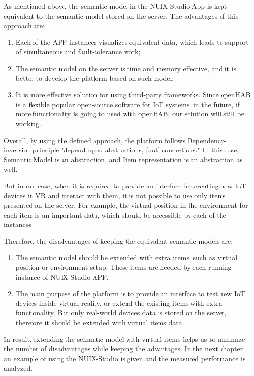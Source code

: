 As mentioned above, the semantic model in the NUIX-Studio App is kept equivalent to the semantic model stored on the server. The advantages of this approach are:

\begin{enumerate}
    \item Each of the APP instances visualizes equivalent data, which leads to support of simultaneous and fault-tolerance work;
    \item The semantic model on the server is time and memory effective, and it is better to develop the platform based on such model;
    \item It is more effective solution for using third-party frameworks. Since openHAB is a flexible popular open-source software for IoT systems, in the future, if more functionality is going to used with openHAB, our solution will still be working.
\end{enumerate}

Overall, by using the defined approach, the platform follows Dependency-inversion principle "depend upon abstractions, [not] concretions." In this case, Semantic Model is an abstraction, and Item representation is an abstraction as well.

But in our case, when it is required to provide an interface for creating new IoT devices in VR and interact with them, it is not possible to use only items presented on the server. For example, the virtual position in the environment for each item is an important data, which should be accessible by each of the instances.

Therefore, the disadvantages of keeping the equivalent semantic models are:

\begin{enumerate}
    \item The semantic model should be extended with extra items, such as virtual position or environment setup. These items are needed by each running instance of NUIX-Studio APP.
    \item The main purpose of the platform is to provide an interface to test new IoT devices inside virtual reality, or extend the existing items with extra functionality. But only real-world devices data is stored on the server, therefore it should be extended with virtual items data.
\end{enumerate}

In result, extending the semantic model with virtual items helps us to minimize the number of disadvantages while keeping the advantages.
In the next chapter an example of using the NUIX-Studio is given and the measured performance is analyzed.

